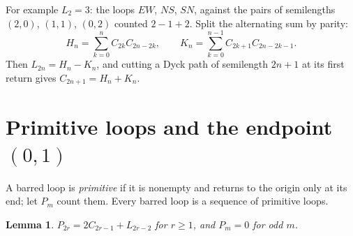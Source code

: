 \documentclass[11pt]{amsart}
\newtheorem{lemma}[theorem]{Lemma}
\theoremstyle{definition}
\theoremstyle{remark}
\begin{document}
For example $L_2=3$: the loops $EW$, $NS$, $SN$, against the pairs of semilengths $(2,0)$, $(1,1)$, $(0,2)$ counted
$2-1+2$. Split the alternating sum by parity:
\[
  H_n=\sum_{k=0}^nC_{2k}C_{2n-2k},\qquad K_n=\sum_{k=0}^{n-1}C_{2k+1}C_{2n-2k-1}.
\]
Then $L_{2n}=H_n-K_n$, and cutting a Dyck path of semilength $2n+1$ at its first return gives $C_{2n+1}=H_n+K_n$.

\section{Primitive loops and the endpoint $(0,1)$}\label{sec:01}

A barred loop is \emph{primitive} if it is nonempty and returns to the origin only at its end; let $P_m$ count them.
Every barred loop is a sequence of primitive loops.

\begin{lemma}\label{lem:prim}
$P_{2r}=2C_{2r-1}+L_{2r-2}$ for $r\ge1$, and $P_m=0$ for odd $m$.
\end{lemma}
\end{document}
